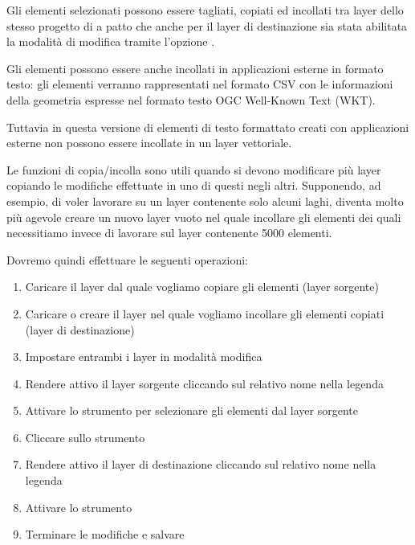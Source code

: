
Gli elementi selezionati possono essere tagliati, copiati ed incollati
tra layer dello stesso progetto di \qg a patto che anche per il layer di destinazione
sia stata abilitata la modalità di modifica tramite l'opzione 
.

Gli elementi possono essere anche incollati in applicazioni esterne in formato testo: gli 
elementi verranno rappresentati nel formato CSV con le informazioni della geometria 
espresse nel formato testo OGC Well-Known Text (WKT).

Tuttavia in questa versione di \qg elementi di testo formattato creati con
applicazioni esterne non possono essere incollate in un layer vettoriale.

Le funzioni di copia/incolla sono utili quando si devono modificare più 
layer copiando le modifiche effettuate in uno di questi negli altri. 
Supponendo, ad esempio, di voler lavorare su un layer contenente solo alcuni
laghi, diventa molto più agevole creare un nuovo layer vuoto nel quale
incollare gli elementi dei quali necessitiamo invece di lavorare sul layer 
 contenente 5000 elementi. 

Dovremo quindi effettuare le seguenti operazioni:

\begin{enumerate}
\item Caricare il layer dal quale vogliamo copiare gli elementi (layer
sorgente)
\item Caricare o creare il layer nel quale vogliamo incollare gli elementi
copiati (layer di destinazione) 
\item Impostare entrambi i layer in modalità modifica 
\item Rendere attivo il layer sorgente cliccando sul relativo nome nella
legenda 
\item Attivare lo strumento 
per selezionare gli elementi dal layer sorgente
\item Cliccare sullo strumento 
\item Rendere attivo il layer di destinazione cliccando sul relativo nome
nella legenda
\item Attivare lo strumento  
\item Terminare le modifiche e salvare
\end{enumerate}

